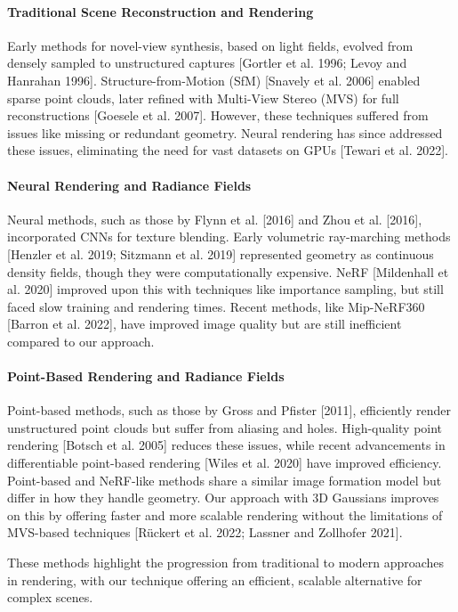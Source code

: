\documentclass[11pt]{report}
\begin{document}
\paragraph{Traditional Scene Reconstruction and Rendering}
Early methods for novel-view synthesis, based on light fields, evolved from densely sampled to unstructured captures [Gortler et al. 1996; Levoy and Hanrahan 1996]. Structure-from-Motion (SfM) [Snavely et al. 2006] enabled sparse point clouds, later refined with Multi-View Stereo (MVS) for full reconstructions [Goesele et al. 2007]. However, these techniques suffered from issues like missing or redundant geometry. Neural rendering has since addressed these issues, eliminating the need for vast datasets on GPUs [Tewari et al. 2022].

\paragraph{Neural Rendering and Radiance Fields}
Neural methods, such as those by Flynn et al. [2016] and Zhou et al. [2016], incorporated CNNs for texture blending. Early volumetric ray-marching methods [Henzler et al. 2019; Sitzmann et al. 2019] represented geometry as continuous density fields, though they were computationally expensive. NeRF [Mildenhall et al. 2020] improved upon this with techniques like importance sampling, but still faced slow training and rendering times. Recent methods, like Mip-NeRF360 [Barron et al. 2022], have improved image quality but are still inefficient compared to our approach.

\paragraph{Point-Based Rendering and Radiance Fields}
Point-based methods, such as those by Gross and Pfister [2011], efficiently render unstructured point clouds but suffer from aliasing and holes. High-quality point rendering [Botsch et al. 2005] reduces these issues, while recent advancements in differentiable point-based rendering [Wiles et al. 2020] have improved efficiency. Point-based and NeRF-like methods share a similar image formation model but differ in how they handle geometry. Our approach with 3D Gaussians improves on this by offering faster and more scalable rendering without the limitations of MVS-based techniques [R\"{u}ckert et al. 2022; Lassner and Zollhofer 2021].

These methods highlight the progression from traditional to modern approaches in rendering, with our technique offering an efficient, scalable alternative for complex scenes.
\end{document}
